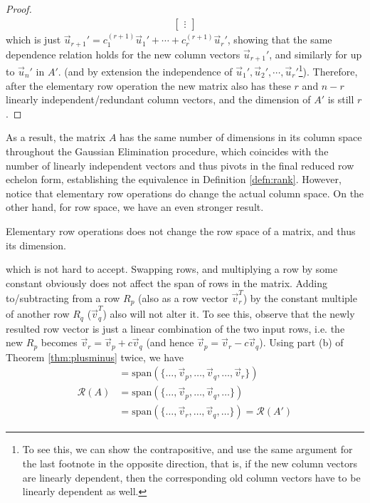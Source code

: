 \begin{proof}
{\begin{align*}
\begin{bmatrix}
\vdots
\end{bmatrix}
\end{align*}
which is just $\vec{u}_{r+1}' = c_1^{(r+1)}\vec{u}_1' + \cdots + c_r^{(r+1)}\vec{u}_r'$, showing that the same dependence relation holds for the new column vectors $\vec{u}_{r+1}'$, and similarly for up to $\vec{u}_n'$ in $A'$.} 
(and by extension the independence of $\vec{u}_1', \vec{u}_2', \cdots, \vec{u}_r'$\footnote{To see this, we can show the contrapositive, and use the same argument for the last footnote in the opposite direction, that is, if the new column vectors are linearly dependent, then the corresponding old column vectors have to be linearly dependent as well.}). Therefore, after the elementary row operation the new matrix also has these $r$ and $n-r$ linearly independent/redundant column vectors, and the dimension of $A'$ is still $r$.
\end{proof}
As a result, the matrix $A$ has the same number of dimensions in its column space throughout the Gaussian Elimination procedure, which coincides with the number of linearly independent vectors and thus pivots in the final reduced row echelon form, establishing the equivalence in Definition \ref{defn:rank}. However, notice that elementary row operations do change the actual column space. On the other hand, for row space, we have an even stronger result.
\begin{proper}
\label{proper:elemrowoprowrank}
Elementary row operations does not change the row space of a matrix, and thus its dimension.
\end{proper}
which is not hard to accept. Swapping rows, and multiplying a row by some constant obviously does not affect the span of rows in the matrix. Adding to/subtracting from a row $R_p$ (also as a row vector $\vec{v}_r^T$) by the constant multiple of another row $R_q$ ($\vec{v}_q^T$) also will not alter it. To see this, observe that the newly resulted row vector is just a linear combination of the two input rows, i.e. the new $R_p$ becomes $\vec{v}_{r} = \vec{v}_p + c\vec{v}_q$ (and hence $\vec{v}_p = \vec{v}_r - c\vec{v}_q$). Using part (b) of Theorem \ref{thm:plusminus} twice, we have
\begin{align*}
&= \text{span}(\{\ldots, \vec{v}_p, \ldots, \vec{v}_q, \ldots, \vec{v}_r \}) \\
\mathcal{R}(A) &= \text{span}(\{\ldots, \vec{v}_p, \ldots, \vec{v}_q, \ldots\}) \\
&= \text{span}(\{\ldots, \vec{v}_r, \ldots, \vec{v}_q, \ldots\}) = \mathcal{R}(A')
\end{align*}
